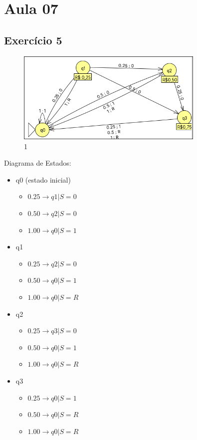 \section{Aula 07}
    \subsection{Exercício 5}
        \begin{figure}[H]
            \centering
            \includegraphics[width=0.8\textwidth]{Aula07/Images/Exercicio1.png}
            \caption*{1}
        \end{figure}
        Diagrama de Estados:
        \begin{itemize}
            \item q0 (estado inicial)
                \begin{itemize}
                    \item $0.25 \to q1 | S = 0$
                    \item $0.50 \to q2 | S = 0$
                    \item $1.00 \to q0 | S = 1$
                \end{itemize}
            \item q1
                \begin{itemize}
                    \item $0.25 \to q2 | S = 0$
                    \item $0.50 \to q0 | S = 1$
                    \item $1.00 \to q0 | S = R$
                \end{itemize}
            \item q2
                \begin{itemize}
                    \item $0.25 \to q3 | S = 0$
                    \item $0.50 \to q0 | S = 1$
                    \item $1.00 \to q0 | S = R$
                \end{itemize}
            \item q3
                \begin{itemize}
                    \item $0.25 \to q0 | S = 1$
                    \item $0.50 \to q0 | S = R$
                    \item $1.00 \to q0 | S = R$
                \end{itemize}                
        \end{itemize}
    
